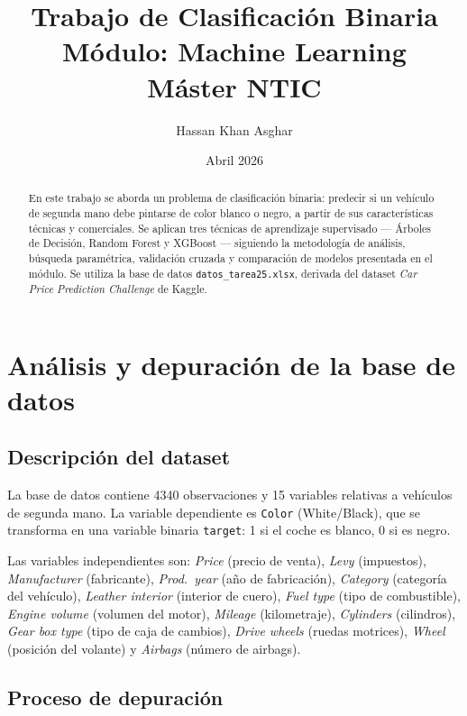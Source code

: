 \documentclass[12pt,a4paper]{article}
\title{\textbf{Trabajo de Clasificación Binaria} \\ \large Módulo: Machine Learning \\ \large Máster NTIC}
\author{Hassan Khan Asghar}
\date{Abril 2026}
\begin{document}
\maketitle
\thispagestyle{empty}

\begin{abstract}
En este trabajo se aborda un problema de clasificación binaria: predecir si un vehículo de segunda mano debe pintarse de color blanco o negro, a partir de sus características técnicas y comerciales. Se aplican tres técnicas de aprendizaje supervisado --- Árboles de Decisión, Random Forest y XGBoost --- siguiendo la metodología de análisis, búsqueda paramétrica, validación cruzada y comparación de modelos presentada en el módulo. Se utiliza la base de datos \texttt{datos\_tarea25.xlsx}, derivada del dataset \emph{Car Price Prediction Challenge} de Kaggle.
\end{abstract}

\tableofcontents
\newpage

\section{Análisis y depuración de la base de datos}

\subsection{Descripción del dataset}

La base de datos contiene 4340 observaciones y 15 variables relativas a vehículos de segunda mano. La variable dependiente es \texttt{Color} (White/Black), que se transforma en una variable binaria \texttt{target}: 1 si el coche es blanco, 0 si es negro.

Las variables independientes son: \textit{Price} (precio de venta), \textit{Levy} (impuestos), \textit{Manufacturer} (fabricante), \textit{Prod.\ year} (año de fabricación), \textit{Category} (categoría del vehículo), \textit{Leather interior} (interior de cuero), \textit{Fuel type} (tipo de combustible), \textit{Engine volume} (volumen del motor), \textit{Mileage} (kilometraje), \textit{Cylinders} (cilindros), \textit{Gear box type} (tipo de caja de cambios), \textit{Drive wheels} (ruedas motrices), \textit{Wheel} (posición del volante) y \textit{Airbags} (número de airbags).

\subsection{Proceso de depuración}
\end{document}

